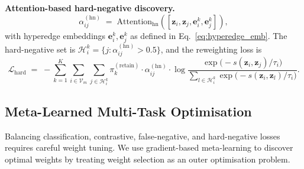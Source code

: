 \documentclass[10pt]{article}
\theoremstyle{plain}
\theoremstyle{definition}
\begin{document}
\textbf{Attention-based hard-negative discovery.}
\begin{equation}
\alpha_{ij}^{(\mathrm{hn})} \;=\;
\mathrm{Attention}_{\mathrm{hn}}\!\left(
[\mathbf{z}_i,\mathbf{z}_j,\mathbf{e}_i^{k},\mathbf{e}_j^{k}]\right),
\label{eq:hn_attention}
\end{equation}
with hyperedge embeddings $\mathbf{e}_i^{k},\mathbf{e}_j^{k}$ as
defined in Eq.~\eqref{eq:hyperedge_emb}. The hard-negative set is
$\mathcal{H}_i^{k}=\{j\!:\alpha_{ij}^{(\mathrm{hn})}\!>0.5\}$, and the
reweighting loss is
\begin{equation}
\mathcal{L}_{\mathrm{hard}} \;=\;
-\sum_{k=1}^{K}\sum_{i\in\mathcal{V}_m}
\sum_{j\in\mathcal{H}_i^{k}}
\pi_k^{(\mathrm{retain})}\cdot\alpha_{ij}^{(\mathrm{hn})}
\cdot\log
\frac{\exp\!\big(-s(\mathbf{z}_i,\mathbf{z}_j)/\tau_i\big)}
     {\sum_{l\in\mathcal{H}_i^{k}}
      \exp\!\big(-s(\mathbf{z}_i,\mathbf{z}_l)/\tau_i\big)}.
\label{eq:L_hard}
\end{equation}

\subsection{Meta-Learned Multi-Task Optimisation}
\label{sec:meta}

Balancing classification, contrastive, false-negative, and hard-negative losses requires careful weight tuning. We use gradient-based meta-learning to discover optimal weights by treating weight selection as an outer optimisation problem.
\end{document}
